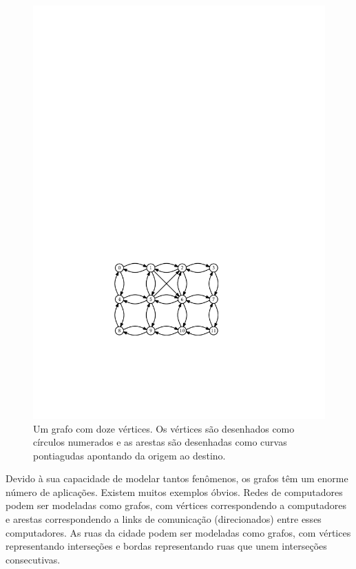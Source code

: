 \begin{figure}
	\begin{center}
		\includegraphics[scale=0.90909]{figs/graph}
	\end{center}
	\caption{Um grafo com doze vértices. Os vértices são desenhados como círculos numerados e as arestas são desenhadas como curvas pontiagudas apontando da origem ao destino.}
\end{figure}

Devido à sua capacidade de modelar tantos fenômenos, os grafos têm um enorme número de aplicações. Existem muitos exemplos óbvios. Redes de computadores podem ser modeladas como grafos, com vértices correspondendo a computadores e arestas correspondendo a links de comunicação (direcionados) entre esses computadores. As ruas da cidade podem ser modeladas como grafos, com vértices representando interseções e bordas representando ruas que unem interseções consecutivas.

